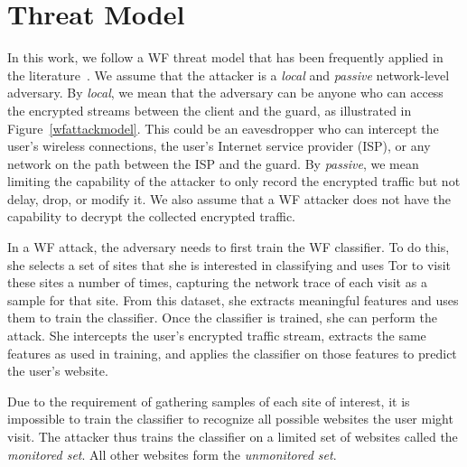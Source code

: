 \documentclass[USenglish,oneside,twocolumn]{article}
\begin{document}
\section{Threat Model}



In this work, we follow a WF threat model that has been frequently applied in the literature~\cite{herrmann2009website,cai2012touching,dyer2012peek,wang2013improved,wang2014effective, panchenko2016website, hayes2016k, Rimmer2018, Sirinam2018, sirinam2019triplet}. We assume that the attacker is a \textit{local} and \textit{passive} network-level adversary. By \emph{local}, we mean that the adversary can be anyone who can access the encrypted streams between the client and the guard, as illustrated in Figure~\ref{wfattackmodel}. This could be an eavesdropper who can intercept the user's wireless connections, the user's Internet service provider (ISP), or any network on the path between the ISP and the guard. By \emph{passive}, we mean limiting the capability of the attacker to only record the encrypted traffic but not delay, drop, or modify it. We also assume that a WF attacker does not have the capability to decrypt the collected encrypted traffic. 

In a WF attack, the adversary needs to first train the WF classifier. To do this, she selects a set of sites that she is interested in classifying and uses Tor to visit these sites a number of times, capturing the network trace of each visit as a sample for that site. From this dataset, she extracts meaningful features and uses them to train the classifier. Once the classifier is trained, she can perform the attack. She intercepts the user's encrypted traffic stream, extracts the same features as used in training, and applies the classifier on those features to predict the user's website. 

Due to the requirement of gathering samples of each site of interest, it is impossible to train the classifier to recognize all possible websites the user might visit. The attacker thus trains the classifier on a limited set of websites called the \emph{monitored set}. All other websites form the \emph{unmonitored set}.
\end{document}
